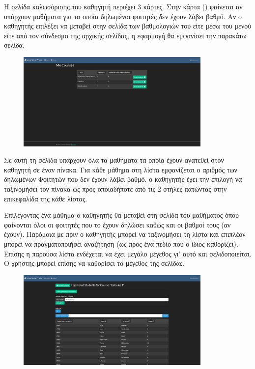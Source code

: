 \documentclass[12pt]{article}
\begin{document}
	Η σελίδα καλωσόρισης του καθηγητή περιέχει 3 κάρτες. Στην κάρτα () φαίνεται αν υπάρχουν μαθήματα για τα οποία δηλωμένοι φοιτητές δεν έχουν λάβει βαθμό. Αν ο καθηγητής επιλέξει να μεταβεί στην σελίδα των βαθμολογιών του είτε μέσω του μενού είτε από τον σύνδεσμο της αρχικής σελίδας, η εφαρμογή θα εμφανίσει την παρακάτω σελίδα.
	
	\begin{figure}[H]
		\centering
		\includegraphics[width=0.85\textwidth]{mylessons.png}
		\caption{}
		\label{fig:emptyView}
	\end{figure}
	
	Σε αυτή τη σελίδα υπάρχουν όλα τα μαθήματα τα οποία έχουν ανατεθεί στον καθηγητή σε έναν πίνακα. Για κάθε μάθημα στη λίστα εμφανίζεται ο αριθμός των δηλωμένων Φοιτητών που δεν έχουν λάβει βαθμό. ο καθηγητής έχει την επιλογή να ταξινομήσει τον πίνακα ως προς οποιαδήποτε από τις 2 στήλες πατώντας στην επικεφαλίδα της κάθε λίστας.
	
	Επιλέγοντας ένα μάθημα ο καθηγητής θα μεταβεί στη σελίδα του μαθήματος όπου φαίνονται όλοι οι φοιτητές που το έχουν δηλώσει καθώς και οι βαθμοί τους (αν έχουν). Παρόμοια με πριν ο καθηγητής μπορεί να ταξινομήσει τη λίστα και επιπλέον μπορεί να πραγματοποιήσει αναζήτηση (ως προς ένα πεδίο που ο ίδιος καθορίζει). Επίσης η παρούσα λίστα ενδέχεται να έχει μεγάλο μέγεθος γι' αυτό και σελιδοποιείται. Ο χρήστης μπορεί επίσης να καθορίσει το μέγεθος της σελίδας.
	
	\begin{figure}[H]
		\centering
		\includegraphics[width=0.85\textwidth]{mystudents.png}
		\caption{}
		\label{fig:emptyView}
	\end{figure}
	
\end{document}
